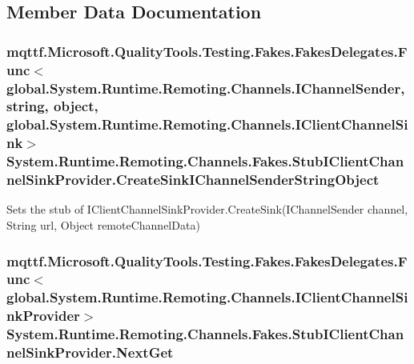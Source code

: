 \subsection{Member Data Documentation}
\hypertarget{class_system_1_1_runtime_1_1_remoting_1_1_channels_1_1_fakes_1_1_stub_i_client_channel_sink_provider_adea896dfe83a6f59b26aea585fcd9f81}{
\subsubsection[{Create\-Sink\-I\-Channel\-Sender\-String\-Object}]{\setlength{\rightskip}{0pt plus 5cm}mqttf.\-Microsoft.\-Quality\-Tools.\-Testing.\-Fakes.\-Fakes\-Delegates.\-Func$<$global.\-System.\-Runtime.\-Remoting.\-Channels.\-I\-Channel\-Sender, string, object, global.\-System.\-Runtime.\-Remoting.\-Channels.\-I\-Client\-Channel\-Sink$>$ System.\-Runtime.\-Remoting.\-Channels.\-Fakes.\-Stub\-I\-Client\-Channel\-Sink\-Provider.\-Create\-Sink\-I\-Channel\-Sender\-String\-Object}}\label{class_system_1_1_runtime_1_1_remoting_1_1_channels_1_1_fakes_1_1_stub_i_client_channel_sink_provider_adea896dfe83a6f59b26aea585fcd9f81}


Sets the stub of I\-Client\-Channel\-Sink\-Provider.\-Create\-Sink(\-I\-Channel\-Sender channel, String url, Object remote\-Channel\-Data)

\hypertarget{class_system_1_1_runtime_1_1_remoting_1_1_channels_1_1_fakes_1_1_stub_i_client_channel_sink_provider_a9bc9620daf22641803379354210fe9d8}{
\subsubsection[{Next\-Get}]{\setlength{\rightskip}{0pt plus 5cm}mqttf.\-Microsoft.\-Quality\-Tools.\-Testing.\-Fakes.\-Fakes\-Delegates.\-Func$<$global.\-System.\-Runtime.\-Remoting.\-Channels.\-I\-Client\-Channel\-Sink\-Provider$>$ System.\-Runtime.\-Remoting.\-Channels.\-Fakes.\-Stub\-I\-Client\-Channel\-Sink\-Provider.\-Next\-Get}}\label{class_system_1_1_runtime_1_1_remoting_1_1_channels_1_1_fakes_1_1_stub_i_client_channel_sink_provider_a9bc9620daf22641803379354210fe9d8}


